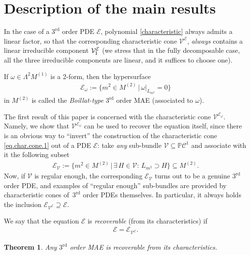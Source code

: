 \documentclass[pdftex]{sigma}
\newcommand{\C}{\mathcal{C}}
\newcommand{\M}{\mathcal{V}}
\newcommand{\MM}{\mathcal{V}_{\textrm{\normalfont I}}}
\newcommand{\E}{\mathcal{E}}
\renewcommand{\P}{\mathbb{P}}
\newcommand{\Rd}{^\textrm{rd}}
\newcommand{\elle}{H}
\numberwithin{equation}{section}
\newtheorem{Theorem}{Theorem}[section]
\begin{document}
\section{Description of the main results}\label{subDescrMainRes}

In the case of a $3\Rd$ order PDE $\E$, polynomial \eqref{characteristic} always admits a linear factor, so that the corresponding characteristic cone $\M^\E$, \emph{always} contains a linear irreducible component $\MM^\E$ (we stress that in the fully decomposable case, all the three irreducible components are linear, and it suf\/f\/ices to choose one).

\begin{Definition}
 If $\omega\in \Lambda^2 M^{(1)}$ is a 2-form, then the hypersurface
 \begin{gather}\label{eqEOmega}
\E_{\omega}:=\big\{ m^2\in M^{(2)}\,|\, \omega|_{L_{m^2}}= 0 \big\}
\end{gather}
in $M^{(2)}$ is called the \emph{Boillat-type} $3\Rd$ order MAE (associated to $\omega$).
\end{Definition}

The f\/irst result of this paper is concerned with the characteristic cone $\M^{\E_\omega}$. %
 Namely, we show that $\M^{\E_\omega}$ can be used to recover the equation itself, since there is an obvious way to ``invert'' the construction of the characteristic cone \eqref{eq.char.cone.1} out of a PDE $\E$: take \emph{any} sub-bundle $\M\subseteq\P\C^1$ and associate with it the following subset
\begin{gather}\label{eqENu}
\E_\M:=\big\{ m^2 \in M^{(2)}\,|\, \exists\,\elle\in\M\colon\, L_{m^2}\supset\elle\}\subseteq M^{(2)}.
\end{gather}
Now, if $\M$ is regular enough, the corresponding $\E_\M$ turns out to be a genuine $3\Rd$ order PDE, and examples of ``regular enough'' sub-bundles are provided by characteristic cones of~$3\Rd$ order PDEs themselves. In particular, it always holds the inclusion $\E_{\M^\E}\supseteq \E$.

\begin{Definition}\label{defMaledetta}
 We say that the equation $\E$ is \emph{recoverable} (from its characteristics) if
 \begin{gather}
\E=\E_{\M^\E}.\label{eqStar}
\end{gather}
\end{Definition}

\begin{Theorem} \label{LemmaNotturnoQuasiMattinieroPromossoATeorema}
 Any $3\Rd$ order MAE is recoverable from its characteristics.
 \end{Theorem}
\end{document}
